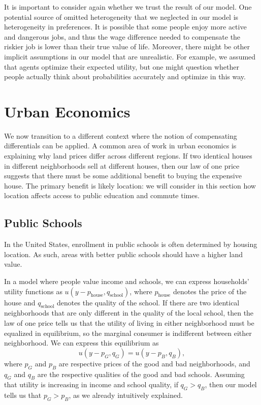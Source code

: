 It is important to consider again whether we trust the result of our model. One potential source of omitted heterogeneity that we neglected in our model is heterogeneity in preferences. It is possible that some people enjoy more active and dangerous jobs, and thus the wage difference needed to compensate the riskier job is lower than their true value of life. Moreover, there might be other implicit assumptions in our model that are unrealistic. For example, we assumed that agents optimize their expected utility, but one might question whether people actually think about probabilities accurately and optimize in this way.

\section{Urban Economics}

We now transition to a different context where the notion of compensating differentials can be applied. A common area of work in urban economics is explaining why land prices differ across different regions. If two identical houses in different neighborhoods sell at different houses, then our law of one price suggests that there must be some additional benefit to buying the expensive house. The primary benefit is likely location: we will consider in this section how location affects access to public education and commute times.

\subsection*{Public Schools} 
In the United States, enrollment in public schools is often determined by housing location. As such, areas with better public schools should have a higher land value. 

In a model where people value income and schools, we can express households' utility functions as $u(y-p_{\text{house}}, q_{\text{school}})$, where $p_{\text{house}}$ denotes the price of the house and $q_{\text{school}}$ denotes the quality of the school. If there are two identical neighborhoods that are only different in the quality of the local school, then the law of one price tells us that the utility of living in either neighborhood must be equalized in equilibrium, so the marginal consumer is indifferent between either neighborhood. We can express this equilibrium as 
$$u(y - p_G, q_G) = u(y-p_B, q_B),$$
where $p_G$ and $p_B$ are respective prices of the good and bad neighborhoods, and $q_G$ and $q_B$ are the respective qualities of the good and bad schools. Assuming that utility is increasing in income and school quality, if $q_G > q_B$, then our model tells us that $p_G > p_B$, as we already intuitively explained.

